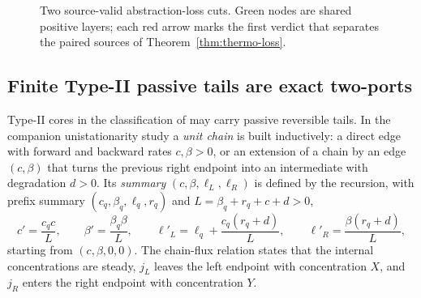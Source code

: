 \documentclass[11pt,a4paper]{article}
\theoremstyle{plain}
\theoremstyle{definition}
\theoremstyle{remark}
\newcommand{\MPAC}{\mathsf{MultiPAC}}
\newcommand{\MCAC}{\mathsf{MultiCAC}}
\newcommand{\DIR}{\mathsf{Dir}}
\newcommand{\LCC}{\mathsf{LinCx}}
\begin{document}
\begin{figure}[t]
\centering
{}
\caption{Two source-valid abstraction-loss cuts. Green nodes are shared positive layers; each red arrow marks the first verdict that separates the paired sources of Theorem~\ref{thm:thermo-loss}.}
\label{fig:hierarchy}
\end{figure}

\subsection{Finite Type-II passive tails are exact two-ports}

Type-II cores in the classification of \cite{blokhuis2020,nandan2026} may carry passive reversible tails. In the companion unistationarity study \cite{typeiicompanion2026} a \emph{unit chain} is built inductively: a direct edge with forward and backward rates $c,\beta>0$, or an extension of a chain by an edge $(c,\beta)$ that turns the previous right endpoint into an intermediate with degradation $d>0$. Its \emph{summary} $(c,\beta,\ell_L,\ell_R)$ is defined by the recursion, with prefix summary $(c_q,\beta_q,\ell_q,r_q)$ and $L=\beta_q+r_q+c+d>0$,
\[
c'=\frac{c_qc}{L},\qquad \beta'=\frac{\beta_q\beta}{L},\qquad \ell'_L=\ell_q+\frac{c_q(r_q+d)}{L},\qquad \ell'_R=\frac{\beta(r_q+d)}{L},
\]
starting from $(c,\beta,0,0)$. The chain-flux relation states that the internal concentrations are steady, $j_L$ leaves the left endpoint with concentration $X$, and $j_R$ enters the right endpoint with concentration $Y$.
\end{document}
